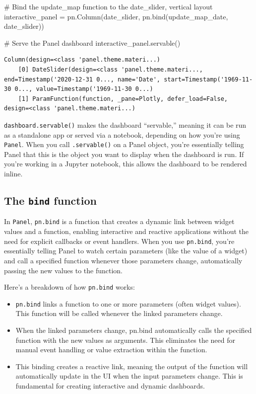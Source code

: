 \documentclass[
  letterpaper,
  DIV=11,
  numbers=noendperiod]{scrreprt}
\newenvironment{Shaded}{\begin{snugshade}}{\end{snugshade}}
\newcommand{\CommentTok}[1]{\textcolor[rgb]{0.37,0.37,0.37}{#1}}
\newcommand{\NormalTok}[1]{\textcolor[rgb]{0.00,0.23,0.31}{#1}}
\newcommand{\OperatorTok}[1]{\textcolor[rgb]{0.37,0.37,0.37}{#1}}
\providecommand{\tightlist}{%
  \setlength{\itemsep}{0pt}\setlength{\parskip}{0pt}}\usepackage{longtable,booktabs,array}
\begin{document}
\begin{Shaded}
\begin{Highlighting}[]
\CommentTok{\# Bind the update\_map function to the date\_slider, vertical layout}
\NormalTok{interactive\_panel }\OperatorTok{=}\NormalTok{ pn.Column(date\_slider, pn.bind(update\_map\_date, date\_slider))}

\CommentTok{\# Serve the Panel dashboard}
\NormalTok{interactive\_panel.servable()}
\end{Highlighting}
\end{Shaded}

\begin{verbatim}
Column(design=<class 'panel.theme.materi...)
    [0] DateSlider(design=<class 'panel.theme.materi..., end=Timestamp('2020-12-31 0..., name='Date', start=Timestamp('1969-11-30 0..., value=Timestamp('1969-11-30 0...)
    [1] ParamFunction(function, _pane=Plotly, defer_load=False, design=<class 'panel.theme.materi...)
\end{verbatim}

\texttt{dashboard.servable()} makes the dashboard ``servable,'' meaning
it can be run as a standalone app or served via a notebook, depending on
how you're using \texttt{Panel}. When you call \texttt{.servable()} on a
Panel object, you're essentially telling Panel that this is the object
you want to display when the dashboard is run. If you're working in a
Jupyter notebook, this allows the dashboard to be rendered inline.

\subsection{\texorpdfstring{The \texttt{bind}
function}{The bind function}}\label{the-bind-function}

In \texttt{Panel}, \texttt{pn.bind} is a function that creates a dynamic
link between widget values and a function, enabling interactive and
reactive applications without the need for explicit callbacks or event
handlers. When you use \texttt{pn.bind}, you're essentially telling
Panel to watch certain parameters (like the value of a widget) and call
a specified function whenever those parameters change, automatically
passing the new values to the function.

Here's a breakdown of how \texttt{pn.bind} works:

\begin{itemize}
\tightlist
\item
  \texttt{pn.bind} links a function to one or more parameters (often
  widget values). This function will be called whenever the linked
  parameters change.
\item
  When the linked parameters change, pn.bind automatically calls the
  specified function with the new values as arguments. This eliminates
  the need for manual event handling or value extraction within the
  function.
\item
  This binding creates a reactive link, meaning the output of the
  function will automatically update in the UI when the input parameters
  change. This is fundamental for creating interactive and dynamic
  dashboards.
\end{itemize}
\end{document}
